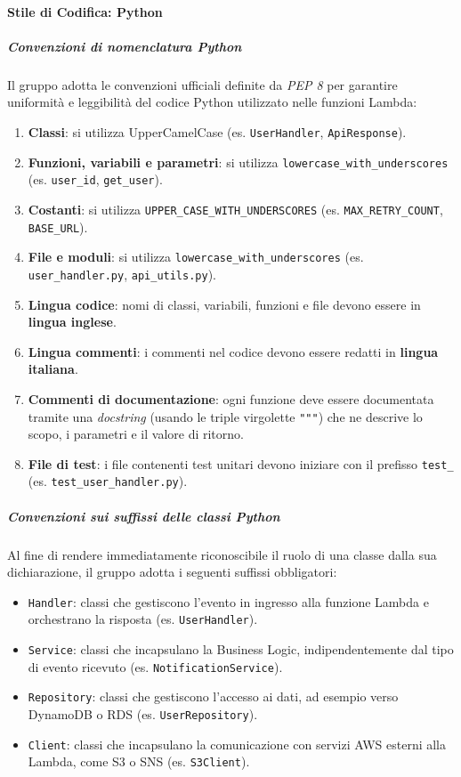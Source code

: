 \documentclass[a4paper,12pt]{article}
\begin{document}
\paragraph{Stile di Codifica: Python} \label{par:stile-cod-py}

\subparagraph{Convenzioni di nomenclatura Python}
Il gruppo adotta le convenzioni ufficiali definite da \textit{PEP 8} per garantire uniformità e leggibilità del codice Python utilizzato nelle funzioni Lambda:
\begin{enumerate}
    \item \textbf{Classi}: si utilizza UpperCamelCase (es. \texttt{UserHandler}, \texttt{ApiResponse}).
    \item \textbf{Funzioni, variabili e parametri}: si utilizza \texttt{lowercase\_with\_underscores} (es. \texttt{user\_id}, \texttt{get\_user}).
    \item \textbf{Costanti}: si utilizza \texttt{UPPER\_CASE\_WITH\_UNDERSCORES} (es. \texttt{MAX\_RETRY\_COUNT}, \texttt{BASE\_URL}).
    \item \textbf{File e moduli}: si utilizza \texttt{lowercase\_with\_underscores} (es. \texttt{user\_handler.py}, \texttt{api\_utils.py}).
    \item \textbf{Lingua codice}: nomi di classi, variabili, funzioni e file devono essere in \textbf{lingua inglese}.
    \item \textbf{Lingua commenti}: i commenti nel codice devono essere redatti in \textbf{lingua italiana}.
    \item \textbf{Commenti di documentazione}: ogni funzione deve essere documentata tramite una \textit{docstring} (usando le triple virgolette \texttt{"""}) che ne descrive lo scopo, i parametri e il valore di ritorno.
    \item \textbf{File di test}: i file contenenti test unitari devono iniziare con il prefisso \texttt{test\_} (es. \texttt{test\_user\_handler.py}).
\end{enumerate}

\subparagraph{Convenzioni sui suffissi delle classi Python}
Al fine di rendere immediatamente riconoscibile il ruolo di una classe dalla sua dichiarazione, il gruppo adotta i seguenti suffissi obbligatori:
\begin{itemize}
    \item \texttt{Handler}: classi che gestiscono l'evento in ingresso alla funzione Lambda e orchestrano la risposta (es. \texttt{UserHandler}).
    \item \texttt{Service}: classi che incapsulano la Business Logic, indipendentemente dal tipo di evento ricevuto (es. \texttt{NotificationService}).
    \item \texttt{Repository}: classi che gestiscono l'accesso ai dati, ad esempio verso DynamoDB o RDS (es. \texttt{UserRepository}).
    \item \texttt{Client}: classi che incapsulano la comunicazione con servizi AWS esterni alla Lambda, come S3 o SNS (es. \texttt{S3Client}).
\end{itemize}
\end{document}
